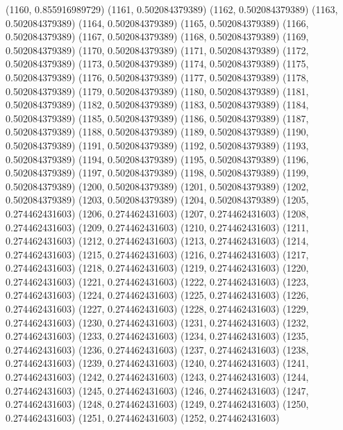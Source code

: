 {					(1160, 0.855916989729)
					(1161, 0.502084379389)
					(1162, 0.502084379389)
					(1163, 0.502084379389)
					(1164, 0.502084379389)
					(1165, 0.502084379389)
					(1166, 0.502084379389)
					(1167, 0.502084379389)
					(1168, 0.502084379389)
					(1169, 0.502084379389)
					(1170, 0.502084379389)
					(1171, 0.502084379389)
					(1172, 0.502084379389)
					(1173, 0.502084379389)
					(1174, 0.502084379389)
					(1175, 0.502084379389)
					(1176, 0.502084379389)
					(1177, 0.502084379389)
					(1178, 0.502084379389)
					(1179, 0.502084379389)
					(1180, 0.502084379389)
					(1181, 0.502084379389)
					(1182, 0.502084379389)
					(1183, 0.502084379389)
					(1184, 0.502084379389)
					(1185, 0.502084379389)
					(1186, 0.502084379389)
					(1187, 0.502084379389)
					(1188, 0.502084379389)
					(1189, 0.502084379389)
					(1190, 0.502084379389)
					(1191, 0.502084379389)
					(1192, 0.502084379389)
					(1193, 0.502084379389)
					(1194, 0.502084379389)
					(1195, 0.502084379389)
					(1196, 0.502084379389)
					(1197, 0.502084379389)
					(1198, 0.502084379389)
					(1199, 0.502084379389)
					(1200, 0.502084379389)
					(1201, 0.502084379389)
					(1202, 0.502084379389)
					(1203, 0.502084379389)
					(1204, 0.502084379389)
					(1205, 0.274462431603)
					(1206, 0.274462431603)
					(1207, 0.274462431603)
					(1208, 0.274462431603)
					(1209, 0.274462431603)
					(1210, 0.274462431603)
					(1211, 0.274462431603)
					(1212, 0.274462431603)
					(1213, 0.274462431603)
					(1214, 0.274462431603)
					(1215, 0.274462431603)
					(1216, 0.274462431603)
					(1217, 0.274462431603)
					(1218, 0.274462431603)
					(1219, 0.274462431603)
					(1220, 0.274462431603)
					(1221, 0.274462431603)
					(1222, 0.274462431603)
					(1223, 0.274462431603)
					(1224, 0.274462431603)
					(1225, 0.274462431603)
					(1226, 0.274462431603)
					(1227, 0.274462431603)
					(1228, 0.274462431603)
					(1229, 0.274462431603)
					(1230, 0.274462431603)
					(1231, 0.274462431603)
					(1232, 0.274462431603)
					(1233, 0.274462431603)
					(1234, 0.274462431603)
					(1235, 0.274462431603)
					(1236, 0.274462431603)
					(1237, 0.274462431603)
					(1238, 0.274462431603)
					(1239, 0.274462431603)
					(1240, 0.274462431603)
					(1241, 0.274462431603)
					(1242, 0.274462431603)
					(1243, 0.274462431603)
					(1244, 0.274462431603)
					(1245, 0.274462431603)
					(1246, 0.274462431603)
					(1247, 0.274462431603)
					(1248, 0.274462431603)
					(1249, 0.274462431603)
					(1250, 0.274462431603)
					(1251, 0.274462431603)
					(1252, 0.274462431603)
}
